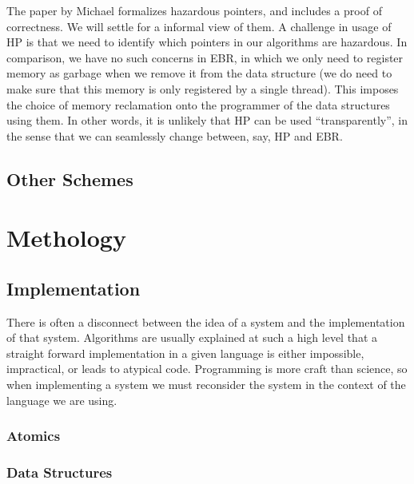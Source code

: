 \documentclass[a4paper,twoside]{report}
\begin{document}
 The
paper by Michael formalizes hazardous pointers, and includes a proof of
correctness. We will settle for a informal view of them.  A challenge in usage
of HP is that we need to identify which pointers in our algorithms are
hazardous. In comparison, we have no such concerns in EBR, in which we only
need to register memory as garbage when we remove it from the data structure
(we do need to make sure that this memory is only registered by a single
thread).  This imposes the choice of memory reclamation onto the programmer of
the data structures using them. In other words, it is unlikely that HP can be
used ``transparently'', in the sense that we can seamlessly change between,
say, HP and EBR\@.



\section{Other Schemes}


\chapter{Methology}

\section{Implementation}
There is often a disconnect between the idea of a system and the implementation
of that system.  Algorithms are usually explained at such a high level that a
straight forward implementation in a given language is either impossible,
impractical, or leads to atypical code.  Programming is more craft than
science, so when implementing a system we must reconsider the system in the
context of the language we are using.


\subsection{Atomics}

\subsection{Data Structures}
\end{document}
